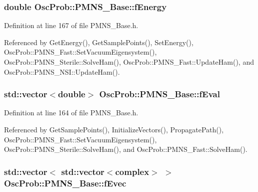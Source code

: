 \subsubsection[{\texorpdfstring{f\+Energy}{fEnergy}}]{\setlength{\rightskip}{0pt plus 5cm}double Osc\+Prob\+::\+P\+M\+N\+S\+\_\+\+Base\+::f\+Energy\hspace{0.3cm}{\ttfamily [protected]}}\hypertarget{classOscProb_1_1PMNS__Base_a2800af6d436972f3e900867790c046b0}{}\label{classOscProb_1_1PMNS__Base_a2800af6d436972f3e900867790c046b0}


Definition at line 167 of file P\+M\+N\+S\+\_\+\+Base.\+h.



Referenced by Get\+Energy(), Get\+Sample\+Points(), Set\+Energy(), Osc\+Prob\+::\+P\+M\+N\+S\+\_\+\+Fast\+::\+Set\+Vacuum\+Eigensystem(), Osc\+Prob\+::\+P\+M\+N\+S\+\_\+\+Sterile\+::\+Solve\+Ham(), Osc\+Prob\+::\+P\+M\+N\+S\+\_\+\+Fast\+::\+Update\+Ham(), and Osc\+Prob\+::\+P\+M\+N\+S\+\_\+\+N\+S\+I\+::\+Update\+Ham().

\subsubsection[{\texorpdfstring{f\+Eval}{fEval}}]{\setlength{\rightskip}{0pt plus 5cm}std\+::vector$<$double$>$ Osc\+Prob\+::\+P\+M\+N\+S\+\_\+\+Base\+::f\+Eval\hspace{0.3cm}{\ttfamily [protected]}}\hypertarget{classOscProb_1_1PMNS__Base_a6319c34d7decbb9d7d6da279c06e8c2d}{}\label{classOscProb_1_1PMNS__Base_a6319c34d7decbb9d7d6da279c06e8c2d}


Definition at line 164 of file P\+M\+N\+S\+\_\+\+Base.\+h.



Referenced by Get\+Sample\+Points(), Initialize\+Vectors(), Propagate\+Path(), Osc\+Prob\+::\+P\+M\+N\+S\+\_\+\+Fast\+::\+Set\+Vacuum\+Eigensystem(), Osc\+Prob\+::\+P\+M\+N\+S\+\_\+\+Sterile\+::\+Solve\+Ham(), and Osc\+Prob\+::\+P\+M\+N\+S\+\_\+\+Fast\+::\+Solve\+Ham().

\subsubsection[{\texorpdfstring{f\+Evec}{fEvec}}]{\setlength{\rightskip}{0pt plus 5cm}std\+::vector$<$ std\+::vector$<${\bf complex}$>$ $>$ Osc\+Prob\+::\+P\+M\+N\+S\+\_\+\+Base\+::f\+Evec\hspace{0.3cm}{\ttfamily [protected]}}\hypertarget{classOscProb_1_1PMNS__Base_a093e7bd31d4ef52ed52df414e12c1d17}{}\label{classOscProb_1_1PMNS__Base_a093e7bd31d4ef52ed52df414e12c1d17}


